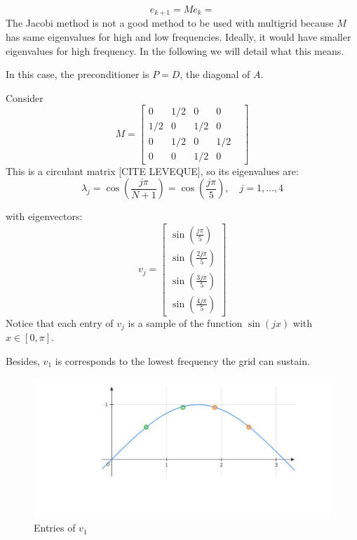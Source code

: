 \documentclass[12pt,a4paper,twoside]{article}
\begin{document}
\begin{equation}
    e_{k+1} = M e_k = 
\end{equation}
The Jacobi method is not a good method to be used with multigrid because $M$ has same eigenvalues for high and low frequencies. Ideally, it would have smaller eigenvalues for high frequency. In the following we will detail what this means.

In this case, the preconditioner is $P=D$, the diagonal of $A$.

Consider 
\begin{equation*}
    M = \begin{bmatrix}
        0 & 1/2 & 0 & 0 \\
        1/2 & 0  &1/2  &0 \\
        0 & 1/2 & 0  &1/2 & \\
        0 & 0 & 1/2 & 0
    \end{bmatrix}
\end{equation*}
This is a circulant matrix [CITE LEVEQUE], so its eigenvalues are: 
\begin{equation*}
    \lambda_j = \cos\left( \frac{j \pi}{N+1}\right) = \cos\left( \frac{j \pi}{5}\right), \quad j=1, \dots, 4
\end{equation*}

with eigenvectors: 
\begin{equation*}
    v_j=\begin{bmatrix}
        \sin\left( \frac{j \pi}{5}\right) \\
        \sin\left( \frac{2j \pi}{5}\right) \\
        \sin\left( \frac{3j \pi}{5}\right) \\
        \sin\left( \frac{4j \pi}{5}\right)
    \end{bmatrix}
\end{equation*}
Notice that each entry of $v_j$ is a sample of the function $\sin(jx)$ with $x\in [0,\pi]$. 

Besides, $v_1$ is corresponds to the lowest frequency the grid can sustain. 

\begin{figure}[H]
    \centering
    \includegraphics[width=\textwidth]{diagram-jacobi-v1.png}
    \caption{Entries of $v_1$}
    \label{fig:jacobi-v1}
\end{figure}
\end{document}
